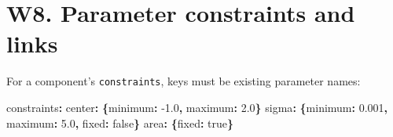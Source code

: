 \documentclass[
  10pt,
  a4paper,
  oneside]{scrreprt}
\newenvironment{Shaded}{}{}
\newcommand{\AttributeTok}[1]{\textcolor[rgb]{0.49,0.56,0.16}{#1}}
\newcommand{\CharTok}[1]{\textcolor[rgb]{0.25,0.44,0.63}{#1}}
\newcommand{\FloatTok}[1]{\textcolor[rgb]{0.25,0.63,0.44}{#1}}
\newcommand{\FunctionTok}[1]{\textcolor[rgb]{0.02,0.16,0.49}{#1}}
\newcommand{\KeywordTok}[1]{\textcolor[rgb]{0.00,0.44,0.13}{\textbf{#1}}}
\begin{document}
\hypertarget{w8.-parameter-constraints-and-links}{%
\section{W8. Parameter constraints and
links}\label{w8.-parameter-constraints-and-links}}

For a component's \texttt{constraints}, keys must be existing parameter
names:

\begin{Shaded}
\begin{Highlighting}[]
\FunctionTok{constraints}\KeywordTok{:}
\AttributeTok{  }\FunctionTok{center}\KeywordTok{:}\AttributeTok{ }\KeywordTok{\{}\FunctionTok{minimum}\KeywordTok{:}\AttributeTok{ }\FloatTok{{-}1.0}\KeywordTok{,}\AttributeTok{ }\FunctionTok{maximum}\KeywordTok{:}\AttributeTok{ }\FloatTok{2.0}\KeywordTok{\}}
\AttributeTok{  }\FunctionTok{sigma}\KeywordTok{:}\AttributeTok{ }\KeywordTok{\{}\FunctionTok{minimum}\KeywordTok{:}\AttributeTok{ }\FloatTok{0.001}\KeywordTok{,}\AttributeTok{ }\FunctionTok{maximum}\KeywordTok{:}\AttributeTok{ }\FloatTok{5.0}\KeywordTok{,}\AttributeTok{ }\FunctionTok{fixed}\KeywordTok{:}\AttributeTok{ }\CharTok{false}\KeywordTok{\}}
\AttributeTok{  }\FunctionTok{area}\KeywordTok{:}\AttributeTok{ }\KeywordTok{\{}\FunctionTok{fixed}\KeywordTok{:}\AttributeTok{ }\CharTok{true}\KeywordTok{\}}
\end{Highlighting}
\end{Shaded}
\end{document}
